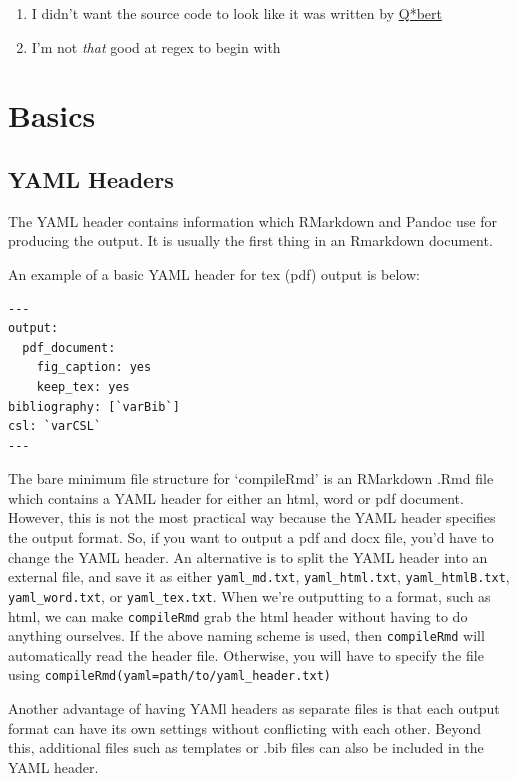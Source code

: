 \documentclass[]{article}
\begin{document}
\begin{enumerate}
\item
  I didn't want the source code to look like it was written by
  \href{http://en.wikipedia.org/wiki/Q*bert}{Q*bert}\\
\item
  I'm not \emph{that} good at regex to begin with
\end{enumerate}

\section{Basics}\label{basics}

\subsection{YAML Headers}\label{yaml-headers}

The YAML header contains information which RMarkdown and Pandoc use for
producing the output. It is usually the first thing in an Rmarkdown
document.

An example of a basic YAML header for tex (pdf) output is below:

\begin{verbatim}
---
output:
  pdf_document:
    fig_caption: yes
    keep_tex: yes
bibliography: [`varBib`]
csl: `varCSL`
---
\end{verbatim}

The bare minimum file structure for `compileRmd' is an RMarkdown .Rmd
file which contains a YAML header for either an html, word or pdf
document. However, this is not the most practical way because the YAML
header specifies the output format. So, if you want to output a pdf and
docx file, you'd have to change the YAML header. An alternative is to
split the YAML header into an external file, and save it as either
\texttt{yaml\_md.txt}, \texttt{yaml\_html.txt},
\texttt{yaml\_htmlB.txt}, \texttt{yaml\_word.txt}, or
\texttt{yaml\_tex.txt}. When we're outputting to a format, such as html,
we can make \texttt{compileRmd} grab the html header without having to
do anything ourselves. If the above naming scheme is used, then
\texttt{compileRmd} will automatically read the header file. Otherwise,
you will have to specify the file using
\texttt{compileRmd(yaml=\textquotesingle{}path/to/yaml\_header.txt\textquotesingle{})}

Another advantage of having YAMl headers as separate files is that each
output format can have its own settings without conflicting with each
other. Beyond this, additional files such as templates or .bib files can
also be included in the YAML header.
\end{document}
